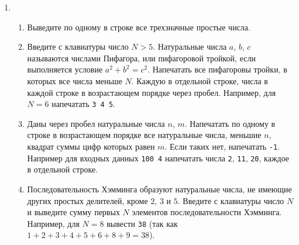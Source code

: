 \documentclass{article}
\begin{document}
\begin{enumerate}[label={}, leftmargin=0pt, itemindent=0pt]
\begin{enumerate}[label=\arabic{enumi}.\arabic*.]
\end{enumerate}
\hrulefill

\item
\begin{enumerate}[label=\arabic{enumi}.\arabic*.]
\item 
Выведите по одному в строке все трехзначные простые числа.
\item 
Введите с клавиатуры число $N>5$. Натуральные числа $a$, $b$, $c$ называются числами Пифагора, или пифагоровой тройкой, если выполняется условие $a^2+b^2=c^2$. Напечатать все пифагоровы тройки, в которых все числа меньше $N$. Каждую в отдельной строке, числа в каждой строке в возрастающем порядке через пробел. Например, для $N=6$ напечатать \texttt{3 4 5}.
\item 
Даны через пробел натуральные числа $n$, $m$. Напечатать по одному в строке в возрастающем порядке все натуральные числа, меньшие $n$, квадрат суммы цифр которых равен $m$.
Если таких нет, напечатать \texttt{-1}. Например для входных данных \texttt{100 4} напечатать числа \texttt{2}, \texttt{11}, \texttt{20}, каждое в отдельной строке.
\item
Последовательность Хэмминга образуют натуральные числа, не имеющие других простых делителей, кроме $2$, $3$ и $5$. Введите с клавиатуры число $N$ и выведите сумму первых $N$ элементов последовательности Хэмминга. Например, для $N=8$ вывести \texttt{38} (так как $1+2+3+4+5+6+8+9=38$).
\end{enumerate}

\end{enumerate}
\end{document}

